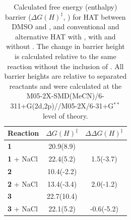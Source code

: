 \begin{table}[!htbp]
\caption[Calculated free energy (enthalpy) barrier for HAT between DMSO and
\cumo, and conventional and alternative HAT with \bno, with and without
.]{Calculated free energy (enthalpy) barrier ($\Delta G(H)^\ddagger$,
\kcalmol) for HAT between DMSO and \cumo, and conventional and alternative HAT
with \bno, with and without . The change in barrier height is
calculated relative to the same reaction without the inclusion of .
All barrier heights are relative to separated reactants and were calculated at
the M05-2X-SMD(MeCN)/6-311+G(2d,2p)//M05-2X/6-31+G$^{**}$ level of theory.}
\label{tab:dmso-dG}
\begin{tabular}{l c c}
Reaction    &  $\Delta G(H)^\ddagger$ &  $\Delta \Delta G(H)^\ddagger$ \\
\hline
\textbf{1}  & 20.9(8.9)  &              \\
\textbf{1} + NaCl & 22.4(5.2)  &  1.5(-3.7)   \\
\textbf{2}    & 10.4(-2.2) &              \\
\textbf{2} + NaCl & 13.4(-3.4) &  2.0(-1.2) \\
\textbf{3} & 22.7(10.4) &                  \\
\textbf{3} + NaCl & 22.1(5.2) & -0.6(-5.2)
\end{tabular}
\end{table}

